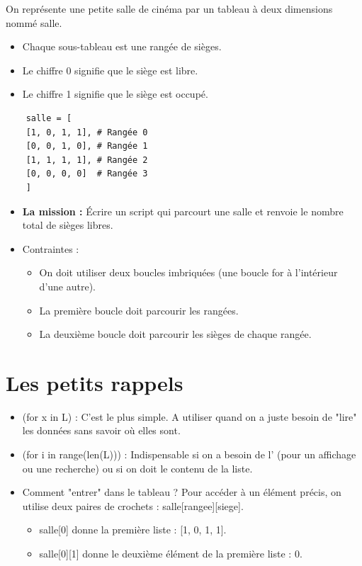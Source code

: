 \newpage
\begin{Exercise}[title={Le Gestionnaire de Cinéma}]
On représente une petite salle de cinéma par un tableau à deux dimensions nommé salle.
\begin{itemize}
    \item Chaque sous-tableau est une rangée de sièges.
    \item Le chiffre 0 signifie que le siège est libre.
    \item Le chiffre 1 signifie que le siège est occupé.
\end{itemize}
\begin{lstlisting}
    salle = [
    [1, 0, 1, 1], # Rangée 0
    [0, 0, 1, 0], # Rangée 1
    [1, 1, 1, 1], # Rangée 2
    [0, 0, 0, 0]  # Rangée 3
    ]
\end{lstlisting}
\begin{itemize}
    \item \textbf{La mission :} Écrire un script qui parcourt une salle et renvoie le nombre total de sièges libres.
    \item Contraintes :
    \begin{itemize}
        \item On doit utiliser deux boucles imbriquées (une boucle for à l'intérieur d'une autre).
        \item La première boucle doit parcourir les rangées.
        \item La deuxième boucle doit parcourir les sièges de chaque rangée.
    \end{itemize}
\end{itemize}


\end{Exercise}

\section*{Les petits rappels}
\begin{itemize}
    \item {} (for x in L) : C'est le plus simple. A utiliser quand on a juste besoin de "lire" les données sans savoir où elles sont.
    \item {} (for i in range(len(L))) : Indispensable si on a besoin de l' (pour un affichage ou une recherche) ou si on doit  le contenu de la liste.
    \item Comment "entrer" dans le tableau ? Pour accéder à un élément précis, on utilise deux paires de crochets : salle[rangee][siege].
    \begin{itemize}
        \item salle[0] donne la première liste : [1, 0, 1, 1].
        \item salle[0][1] donne le deuxième élément de la première liste : 0.
    \end{itemize}
\end{itemize}
